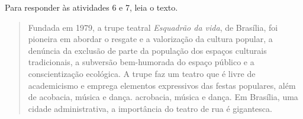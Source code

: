 %
%
%
%
%
%


Para responder às atividades 6 e 7, leia o texto.

\begin{quote}
Fundada em 1979, a trupe teatral \emph{Esquadrão da vida}, de Brasília,
foi pioneira em abordar o resgate e a valorização da cultura popular, a
denúncia da exclusão de parte da população dos espaços culturais tradicionais,
a subversão bem-humorada do espaço público e a conscientização ecológica.
A trupe faz um teatro que é livre de academicismo e emprega elementos
expressivos das festas populares, além de acobacia, música e dança.
acrobacia, música e dança. Em Brasília, uma cidade administrativa,
a importância do teatro de rua é gigantesca.

\end{quote}


